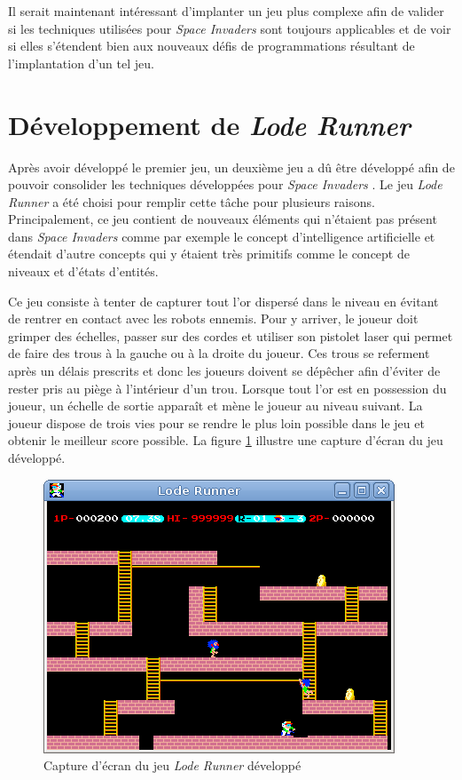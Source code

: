 \documentclass[12pt,oneside,letterpaper,francais]{book}
\newcommand{\lr}{{\textit{Lode Runner }}}
\newcommand{\si}{{\textit{Space Invaders }}}
\begin{document}
Il serait maintenant intéressant d'implanter un jeu plus complexe afin
de valider si les techniques utilisées pour \si sont toujours
applicables et de voir si elles s'étendent bien aux nouveaux défis de
programmations résultant de l'implantation d'un tel jeu.



\section{Développement de \lr}
\label{Exp:ld}

Après avoir développé le premier jeu, un deuxième jeu a dû être
développé afin de pouvoir consolider les techniques développées pour
\si. Le jeu \lr a été choisi pour remplir cette tâche pour plusieurs
raisons. Principalement, ce jeu contient de nouveaux éléments qui
n'étaient pas présent dans \si comme par exemple le concept
d'intelligence artificielle et étendait d'autre concepts qui y étaient
très primitifs comme le concept de niveaux et d'états d'entités.

Ce jeu consiste à tenter de capturer tout l'or dispersé dans le
niveau en évitant de rentrer en contact avec les robots ennemis. Pour
y arriver, le joueur doit grimper des échelles, passer sur des cordes
et utiliser son pistolet laser qui permet de faire des trous à la
gauche ou à la droite du joueur. Ces trous se referment après un
délais prescrits et donc les joueurs doivent se dépêcher afin d'éviter
de rester pris au piège à l'intérieur d'un trou. Lorsque tout l'or est
en possession du joueur, un échelle de sortie apparaît et mène le
joueur au niveau suivant. La joueur dispose de trois vies pour se
rendre le plus loin possible dans le jeu et obtenir le meilleur score
possible. La figure \ref{Exp:ld-screen} illustre une capture d'écran
du jeu développé.

\begin{figure}[htb!]
  \center
  \includegraphics[scale=0.6]{lode-runner-screenshot}
  \caption{Capture d'écran du jeu \lr développé}
  \label{Exp:ld-screen}
\end{figure}
\end{document}
